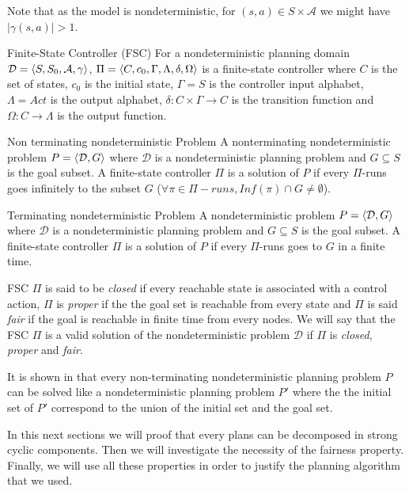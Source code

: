 Note that as the model is nondeterministic, for $(s,a) \in S \times \mathcal{A}$ we might have $|\gamma(s,a)|>1$.

\begin{nameddef}{Finite-State Controller (FSC)}
For a nondeterministic planning domain
$\mathcal{D} = \planningdomain$,
$\Pi = \controller$ is a finite-state controller where
$C$ is the set of states,
$c_0$ is the initial state,
$\Gamma = S$ is the controller input alphabet,
$\Lambda = Act$ is the output alphabet,
$\delta: C \times \Gamma \rightarrow C$ is the transition function and 
$\Omega: C \rightarrow \Lambda$ is the output function.
\end{nameddef}

\begin{nameddef}{Non terminating nondeterministic Problem}
A nonterminating nondeterministic problem $P = \planningproblem$ where $\mathcal{D}$ is a nondeterministic planning problem and $G \subseteq S$ is the goal subset. A finite-state controller $\Pi$ is a solution of $P$ if every $\Pi$-runs goes infinitely to the subset $G$ ($\forall \pi \in \Pi-runs, Inf(\pi) \cap G \neq \emptyset$).
\end{nameddef}

\begin{nameddef}{Terminating nondeterministic Problem}
A nondeterministic problem $P = \planningproblem$ where $\mathcal{D}$ is a nondeterministic planning problem and $G \subseteq S$ is the goal subset. A finite-state controller $\Pi$ is a solution of $P$ if every $\Pi$-runs goes to $G$ in a finite time.
\end{nameddef}

FSC $\Pi$ is said to be \textit{closed} if every reachable state is associated with a control  action, $\Pi$ is \textit{proper} if the the goal set is reachable from every state and $\Pi$ is said \textit{fair} if the goal is reachable in finite time from every nodes.
We will say that the FSC $\Pi$ is a valid solution of the nondeterministic problem $\mathcal{D}$ if $\Pi$ is \textit{closed}, \textit{proper} and \textit{fair}.

It is shown in \cite{patrizi2013fair} that every non-terminating nondeterministic planning problem $P$ can be solved like a nondeterministic planning problem $P'$ where the the initial set of $P'$ correspond to the union of the initial set and the goal set.

In this next sections we will proof that every plans can be decomposed in strong cyclic components.
Then we will investigate the necessity of the fairness property.
Finally, we will use all these properties in order to justify the planning algorithm that we used.


